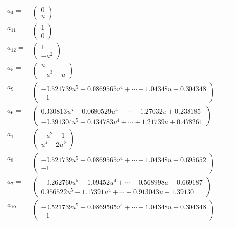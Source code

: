 \documentclass[1p]{elsarticle_modified}
\theoremstyle{definition}
\begin{document}
\begin{tabular}{m{7pt} m{180pt} m{7pt} m{180pt} }
\flushright $a_{4}=$&$\begin{pmatrix}0\\u\end{pmatrix}$ \\
\flushright $a_{11}=$&$\begin{pmatrix}1\\0\end{pmatrix}$ \\
\flushright $a_{12}=$&$\begin{pmatrix}1\\- u^2\end{pmatrix}$ \\
\flushright $a_{5}=$&$\begin{pmatrix}u\\- u^3+u\end{pmatrix}$ \\
\flushright $a_{9}=$&$\begin{pmatrix}-0.521739 u^{5}-0.0869565 u^{4}+\cdots-1.04348 u+0.304348\\-1\end{pmatrix}$ \\
\flushright $a_{6}=$&$\begin{pmatrix}0.330813 u^{5}-0.0680529 u^{4}+\cdots+1.27032 u+0.238185\\-0.391304 u^{5}+0.434783 u^{4}+\cdots+1.21739 u+0.478261\end{pmatrix}$ \\
\flushright $a_{1}=$&$\begin{pmatrix}- u^2+1\\u^4-2 u^2\end{pmatrix}$ \\
\flushright $a_{8}=$&$\begin{pmatrix}-0.521739 u^{5}-0.0869565 u^{4}+\cdots-1.04348 u-0.695652\\-1\end{pmatrix}$ \\
\flushright $a_{7}=$&$\begin{pmatrix}-0.262760 u^{5}-1.09452 u^{4}+\cdots-0.568998 u-0.669187\\0.956522 u^{5}-1.17391 u^{4}+\cdots+0.913043 u-1.39130\end{pmatrix}$ \\
\flushright $a_{10}=$&$\begin{pmatrix}-0.521739 u^{5}-0.0869565 u^{4}+\cdots-1.04348 u+0.304348\\-1\end{pmatrix}$ \\

\end{tabular}
\end{document}
